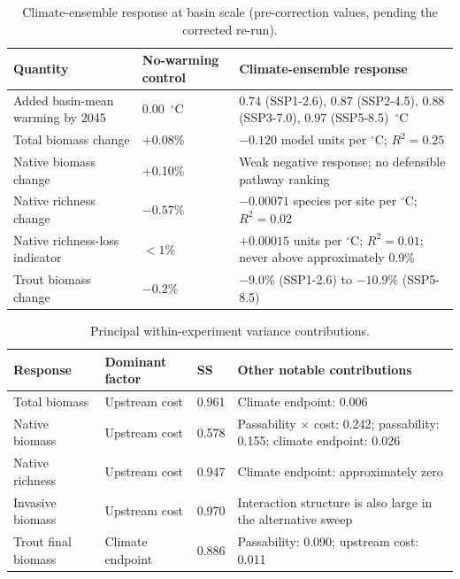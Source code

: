 \documentclass[11pt,a4paper]{article}
\begin{document}
\begin{table}[H]
\centering
\caption{Climate-ensemble response at basin scale (pre-correction values, pending the corrected re-run).}
\small
\begin{tabularx}{\textwidth}{>{\raggedright\arraybackslash}p{}YY}
\toprule
Quantity & No-warming control & Climate-ensemble response \\
\midrule
Added basin-mean warming by 2045 & 0.00~$^\circ$C & 0.74 (SSP1-2.6), 0.87 (SSP2-4.5), 0.88 (SSP3-7.0), 0.97 (SSP5-8.5)~$^\circ$C \\
Total biomass change & +0.08\% & $-0.120$ model units per $^\circ$C; $R^2=0.25$ \\
Native biomass change & +0.10\% & Weak negative response; no defensible pathway ranking \\
Native richness change & $-0.57$\% & $-0.00071$ species per site per $^\circ$C; $R^2=0.02$ \\
Native richness-loss indicator & $<1$\% & $+0.00015$ units per $^\circ$C; $R^2=0.01$; never above approximately 0.9\% \\
Trout biomass change & $-0.2$\% & $-9.0$\% (SSP1-2.6) to $-10.9$\% (SSP5-8.5) \\
\bottomrule
\end{tabularx}
\end{table}

\begin{table}[H]
\centering
\caption{Principal within-experiment variance contributions.}
\small
\begin{tabularx}{\textwidth}{>{\raggedright\arraybackslash}p{}p{}p{}Y}
\toprule
Response & Dominant factor & SS & Other notable contributions \\
\midrule
Total biomass & Upstream cost & 0.961 & Climate endpoint: 0.006 \\
Native biomass & Upstream cost & 0.578 & Passability $\times$ cost: 0.242; passability: 0.155; climate endpoint: 0.026 \\
Native richness & Upstream cost & 0.947 & Climate endpoint: approximately zero \\
Invasive biomass & Upstream cost & 0.970 & Interaction structure is also large in the alternative sweep \\
Trout final biomass & Climate endpoint & 0.886 & Passability: 0.090; upstream cost: 0.011 \\
\bottomrule
\end{tabularx}
\end{table}
\end{document}
